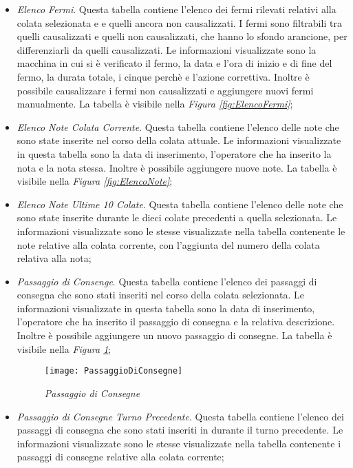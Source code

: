 \begin{itemize}
    \item \textit{Elenco Fermi}. Questa tabella contiene l'elenco dei fermi rilevati relativi alla colata selezionata e 
    e quelli ancora non causalizzati. I fermi sono filtrabili tra quelli causalizzati e quelli non causalizzati,
    che hanno lo sfondo arancione, per differenziarli da quelli causalizzati. Le informazioni visualizzate sono la macchina
    in cui si è verificato il fermo, la data e l'ora di inizio e di fine del fermo, la durata totale, i cinque perchè e
    l'azione correttiva. Inoltre è possibile causalizzare i fermi non causalizzati e aggiungere nuovi fermi manualmente.
    La tabella è visibile nella \textit{Figura \ref{fig:ElencoFermi}};
    
    \item \textit{Elenco Note Colata Corrente}. Questa tabella contiene l'elenco delle note che sono state inserite nel corso
    della colata attuale. Le informazioni visualizzate in questa tabella sono la data di inserimento, l'operatore che ha inserito
    la nota e la nota stessa. Inoltre è possibile aggiungere nuove note. La tabella è visibile nella
    \textit{Figura \ref{fig:ElencoNote}};
    
    \item \textit{Elenco Note Ultime 10 Colate}. Questa tabella contiene l'elenco delle note che sono state inserite durante le
    dieci colate precedenti a quella selezionata. Le informazioni visualizzate sono le stesse visualizzate nella tabella
    contenente le note relative alla colata corrente, con l'aggiunta del numero della colata relativa alla nota;
    
    \item \textit{Passaggio di Consenge}. Questa tabella contiene l'elenco dei passaggi di consegna che sono stati inseriti
    nel corso della colata selezionata. Le informazioni visualizzate in questa tabella sono la data di inserimento, l'operatore
    che ha inserito il passaggio di consegna e la relativa descrizione. Inoltre è possibile aggiungere un nuovo passaggio
    di consegne.
    La tabella è visibile nella \textit{Figura \ref{fig:PassaggioDiConsegne}};

    \begin{figure}[H]
      \texttt{[image: PassaggioDiConsegne]}
      \centering
      \caption{\textit{Passaggio di Consegne}}
      \label{fig:PassaggioDiConsegne}
    \end{figure}
    
    \item \textit{Passaggio di Consegne Turno Precedente}. Questa tabella contiene l'elenco dei passaggi di consegna che sono
    stati inseriti in durante il turno precedente. Le informazioni visualizzate sono le stesse visualizzate nella tabella
    contenente i passaggi di consegne relative alla colata corrente;
    

\end{itemize}
